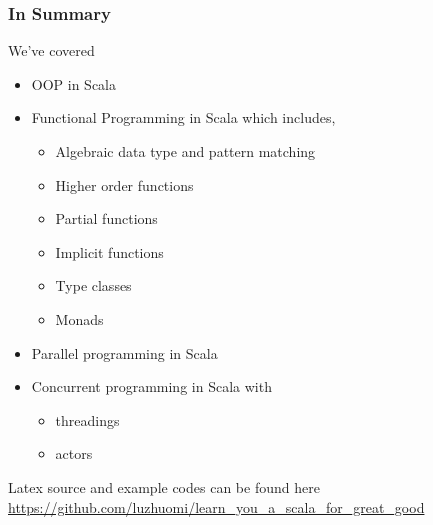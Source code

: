\documentclass{beamer}
\begin{document}
\begin{frame}[fragile]
\frametitle{In Summary}
We've covered
\begin{itemize}
 \item OOP in Scala
 \item Functional Programming in Scala which includes,
  \begin{itemize}
  \item Algebraic data type and pattern matching
  \item Higher order functions
  \item Partial functions
  \item Implicit functions
  \item Type classes
  \item Monads
  \end{itemize}
 \item Parallel programming in Scala
 \item Concurrent programming in Scala with 
     \begin{itemize}
        \item threadings
        \item actors
     \end{itemize}
\end{itemize}
Latex source and example codes can be found here \\
\url{https://github.com/luzhuomi/learn_you_a_scala_for_great_good}
\end{frame}
\end{document}
